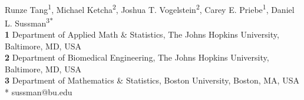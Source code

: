 \documentclass[10pt,letterpaper]{article}
\date{}
\begin{document}
\vspace*{0.2in}

\begin{flushleft}
{\Large
\textbf{} %
}
\newline
\\
Runze Tang\textsuperscript{1},
Michael Ketcha\textsuperscript{2},
Joshua T. Vogelstein\textsuperscript{2},
Carey E. Priebe\textsuperscript{1},
Daniel L. Sussman\textsuperscript{3*}
\\
\bigskip
\textbf{1} Department of Applied Math \& Statistics, The Johns Hopkins University, Baltimore, MD, USA
\\
\textbf{2} Department of Biomedical Engineering,  The Johns Hopkins University, Baltimore, MD, USA
\\
\textbf{3} Department of Mathematics \& Statistics, Boston University, Boston, MA, USA
\\
* sussman@bu.edu
 \bigskip








\end{flushleft}
\end{document}
